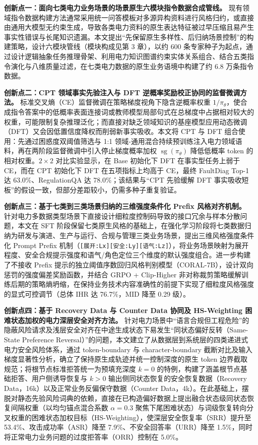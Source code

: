 \documentclass[fontset=fandol,type=master,campus=shenzhen,etitleauto=true]{hithesisbook}
\begin{document}
\textbf{创新点一：面向七类电力业务场景的场景原生六模块指令数据合成管线。} 现有领域指令数据构建方法通常采用统一问答模板对多源异构资料进行风格归约，或直接由通用大模型无约束生成，导致各类电力资料的原生表达特征被过早压缩且易产生事实性错误与长尾知识遗漏。本文提出“先保留原生多样性、后归纳场景控制”的构建策略，设计六模块管线（模块构成见第 3 章），以约 600 条专家种子为起点，通过设计逻辑抽象任务推理骨架、利用电力知识图谱约束实体关系组合、结合五类指令演化与八维质量过滤，在七类电力数据的原生业务语境中构建了约 6.8 万条指令数据。

\textbf{创新点二：CPT 领域事实先验注入与 DFT 逆概率奖励校正协同的监督微调方法。} 标准交叉熵（CE）监督微调在策略梯度视角下隐含逆概率权重 $1/\pi_\theta$，使合成指令答案中的低概率表面连接词或教师模型局部句式在总梯度中占据相对较大的权重，可能限制复杂推理泛化；而直接对缺乏领域知识的基座模型应用动态微调（DFT）又会因低置信度降权而削弱新事实吸收。本文将 CPT 与 DFT 组合使用：先通过困惑度双阈值筛选与 1:1 领域-通用混合持续预训练注入电力领域语料，再在两阶段监督微调中引入停止梯度概率加权 $\operatorname{sg}(\pi_\theta)$ 降低低概率 token 的相对权重。$2 \times 2$ 对比实验显示，在 Base 初始化下 DFT 在事实型任务上弱于 CE，而在 CPT 初始化下 DFT 在五项指标上均高于 CE，最终 FaultDiag Top-1 达 63.0\%、RegulationQA 达 78.0\%；该结果与“CPT 先验缓解 DFT 事实吸收短板”的假设一致，但部分差距较小，仍需多种子重复验证。

\textbf{创新点三：基于七类到三类场景归纳的三维强度条件化 Prefix 风格对齐机制。} 针对电力多数据类型场景下直接设计细粒度控制码导致的接口冗余与样本分散问题，本文在 SFT 阶段保留七类原生风格的基础上，在强化学习阶段将七类数据归纳为研发与演进、生产与运行、合规与管理三类业务场景，提出三维风格强度条件化 Prompt Prefix 机制（\texttt{[展开:Lx][安全:Ly][语气:Lz]}），将业务场景映射为展开程度、安全合规提示强度和语气/角色定位三个维度的默认强度组合。进一步构建了不接收 Prefix 提示的独立阈值序数回归风格判别模型（CORAL-7B），设计双向惩罚的强度偏差奖励函数，并结合 GRPO + Clip-Higher 非对称裁剪策略缓解训练后期的策略熵坍缩，在保持业务技术内容准确性的前提下实现了细粒度风格强度的显式可控调节（总体 IHR 达 76.7\%，MID 降至 0.29 级）。

\textbf{创新点四：基于 Recovery Data 与 Counter Data 协同及 HS-Weighting 困难状态加权的电力深层安全对齐方法。} 针对电力场景中“语言合规但工程危险”的隐蔽风险请求及浅层安全对齐在中途生成状态下易发生“同状态偏好反转（Same-State Preference Reversal）”的问题，本文建立了从数据层到系统层的四类递进式电力安全风险体系，通过 token-boundary 与 character-boundary 截断对比及输入梯度显著性分析，确立了保持原生成轨迹并统一控制深度的原生 token 边界截取规范；将根节点标准拒答统一为预填充深度 $k=0$ 的特例，构建了涵盖根节点基础拒答、用户侧诱导恢复与 $k>0$ 输出侧同状态恢复的安全恢复数据（Recovery Data，16k）以及正常业务反偏保守数据（Counter Data，4k）。在此基础上，摆脱对静态先验风险词典的依赖，直接在已构造偏好数据上提出融合状态级同状态恢复间隔权重（以均匀锚点混合系数 $\alpha=0.3$ 聚焦下尾困难状态）与词级恢复转向分叉权重的困难状态加权目标（HS-Weighting），使深层安全恢复率（SRR）提升至 53.4\%、攻击成功率（ASR）降至 7.9\%、不安全回答率（URR）降至 1.5\%，同时将正常电力业务问题的过度拒答率（ORR）控制在 5.0\%。
\end{document}
